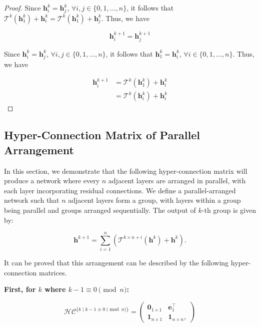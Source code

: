 \begin{proof}
Since $\mathbf{h}_i^k = \mathbf{h}_j^k$, $\forall i, j \in \{0, 1, \ldots, n\}$, it follows that $\mathcal{T}^k(\mathbf{h}_1^k) + \mathbf{h}_i^k = \mathcal{T}^k(\mathbf{h}_1^k) + \mathbf{h}_j^k$. Thus, we have

\begin{equation}
\mathbf{h}_i^{k+1} = \mathbf{h}_j^{k+1}
\end{equation}

Since $\mathbf{h}_i^k = \mathbf{h}_j^k$, $\forall i, j \in \{0, 1, \ldots, n\}$, it follows that $\mathbf{h}_1^k = \mathbf{h}_i^k$, $\forall i \in \{0, 1, \ldots, n\}$. Thus, we have

\begin{align}
\mathbf{h}_i^{k+1} &= \mathcal{T}^k(\mathbf{h}_1^k) + \mathbf{h}_i^k \\
&= \mathcal{T}^k(\mathbf{h}_i^k) + \mathbf{h}_i^k
\end{align}
\end{proof}

\subsection{Hyper-Connection Matrix of Parallel Arrangement}
In this section, we demonstrate that the following hyper-connection matrix will produce a network where every $n$ adjacent layers are arranged in parallel, with each layer incorporating residual connections.
We define a parallel-arranged network such that $n$ adjacent layers form a group, with layers within a group being parallel and groups arranged sequentially. The output of $k$-th group is given by:

\begin{equation}
\mathbf{h}^{k+1}=\sum_{i=1}^{n}(\mathcal{T}^{k\times n+i}(\mathbf{h}^{k}) + \mathbf{h}^k).
\end{equation}

It can be proved that this arrangement can be described by the following hyper-connection matrices.

\textbf{First, for $k$ where $k-1 \equiv 0 \pmod{n}$:}

\begin{equation}
\mathcal{HC}^{\{ k \mid k-1 \equiv 0 \pmod{n} \}}=
  \begin{pmatrix}
  \mathbf{0}_{1\times 1} & \mathbf{e}_1^\intercal \\
  \mathbf{1}_{n\times 1} & \mathbf{1}_{n\times n},
  \end{pmatrix}
\end{equation}

